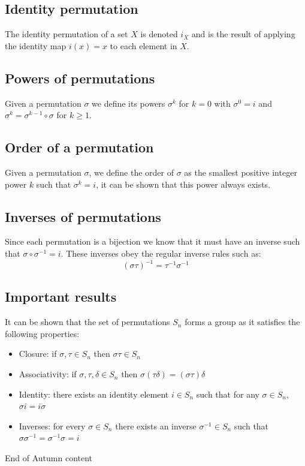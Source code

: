\documentclass[12pt]{article}
\begin{document}
\subsection*{Identity permutation}
The identity permutation of a set \(X\) is denoted \(i_X\) and is the result of applying the identity map \(i(x)=x\) to each element in \(X\).
\subsection*{Powers of permutations}
Given a permutation \(\sigma\) we define its powers \(\sigma^k\) for \(k= 0\) with \(\sigma^0=i\) and \(\sigma^k=\sigma^{k-1}\circ\sigma\) for \(k\geq 1\).
\subsection*{Order of a permutation}
Given a permutation \(\sigma\), we define the order of \(\sigma\) as the smallest positive integer power \(k\) such that \(\sigma^k=i\), it can be shown that this power always exists.
\subsection*{Inverses of permutations}
Since each permutation is a bijection we know that it must have an inverse such that \(\sigma\circ\sigma^{-1}=i\). These inverses obey the regular inverse rules such as:
\[(\sigma\tau)^{-1}=\tau^{-1}\sigma^{-1}\]
\subsection*{Important results}
It can be shown that the set of permutations \(S_n\) forms a group as it satisfies the following properties:
\begin{itemize}
    \item Closure: if \(\sigma,\tau\in S_n\) then \(\sigma\tau\in S_n\) 
    \item Associativity: if \(\sigma,\tau,\delta\in S_n\) then \(\sigma(\tau\delta)=(\sigma\tau)\delta\)
    \item Identity: there exists an identity element \(i\in S_n\) such that for any \(\sigma\in S_n\), \(\sigma i=i\sigma\)
    \item Inverses: for every \(\sigma\in S_n\) there exists an inverse \(\sigma^{-1}\in S_n\) such that \(\sigma\sigma^{-1}=\sigma^{-1}\sigma=i\)
\end{itemize}

\hrulefill
\begin{center}
End of Autumn content
\end{center}
\hrulefill
\end{document}
